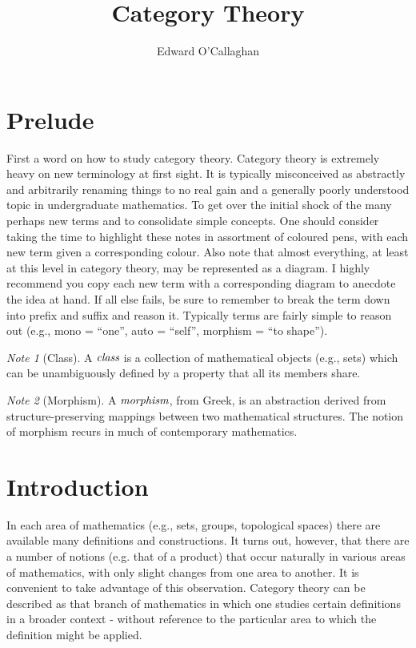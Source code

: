 \documentclass[10pt, oneside, reqno]{amsart}
\title{Category Theory}                               %
\author{Edward O'Callaghan}
\theoremstyle{plain}%
\theoremstyle{definition}
\theoremstyle{remark}
\newtheorem*{note}{Note}
\begin{document}
\maketitle \tableofcontents \clearpage

\section{Prelude} %
\label{sec:purelude}
First a word on how to study category theory. Category theory is extremely heavy on new terminology at first sight.
It is typically misconceived as abstractly and arbitrarily renaming things to no real gain and a generally poorly understood
topic in undergraduate mathematics. To get over the initial shock of the many perhaps new terms and to consolidate simple concepts.
One should consider taking the time to highlight these notes in assortment of coloured pens,
with each new term given a corresponding colour. Also note that almost everything, at least
at this level in category theory, may be represented as a diagram. I highly recommend you copy each new term with a corresponding
diagram to anecdote the idea at hand. If all else fails, be sure to remember to break the term down into prefix and suffix and reason
it. Typically terms are fairly simple to reason out (e.g., mono = ``one'', auto = ``self'', morphism = ``to shape'').

\begin{note}[Class]
 A $\emph{class}$ is a collection of mathematical objects (e.g., sets)
 which can be unambiguously defined by a property that all its members share.
\end{note}

\begin{note}[Morphism]
 A $\emph{morphism}$, from Greek, is an abstraction derived from
 structure-preserving mappings between two mathematical structures.
 The notion of morphism recurs in much of contemporary mathematics.
\end{note}

\section{Introduction} %
\label{sec:introduction}
In each area of mathematics (e.g., sets, groups, topological spaces) there are available many definitions
and constructions. It turns out, however, that there are a number of notions (e.g. that of a product)
that occur naturally in various areas of mathematics, with only slight changes from one area to another.
It is convenient to take advantage of this observation. Category theory can be described as that branch of mathematics
in which one studies certain definitions in a broader context - without reference to the particular area to which
the definition might be applied.
\end{document}
